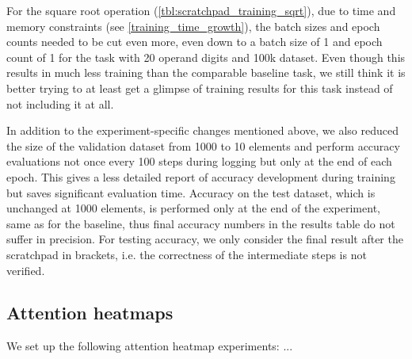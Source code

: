 For the square root operation (\cref{tbl:scratchpad_training_sqrt}), due to time and memory constraints (see \cref{training_time_growth}), the batch sizes and epoch counts needed to be cut even more, even down to a batch size of 1 and epoch count of 1 for the task with 20 operand digits and 100k dataset. Even though this results in much less training than the comparable baseline task, we still think it is better trying to at least get a glimpse of training results for this task instead of not including it at all.


In addition to the experiment-specific changes mentioned above, we also reduced the size of the validation dataset from 1000 to 10 elements and perform accuracy evaluations not once every 100 steps during logging but only at the end of each epoch. This gives a less detailed report of accuracy development during training but saves significant evaluation time. Accuracy on the test dataset, which is unchanged at 1000 elements, is performed only at the end of the experiment, same as for the baseline, thus final accuracy numbers in the results table do not suffer in precision.
For testing accuracy, we only consider the final result after the scratchpad in brackets, i.e. the correctness of the intermediate steps is not verified.



\subsection{Attention heatmaps}
\label{setup:heatmap}

We set up the following attention heatmap experiments: ...